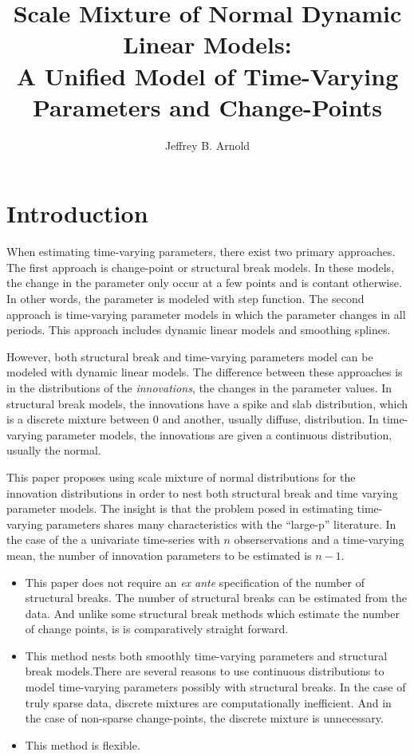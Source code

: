 \documentclass{article}
\author{Jeffrey B. Arnold}
\title{Scale Mixture of Normal Dynamic Linear Models: \\
  A Unified Model of Time-Varying Parameters and Change-Points}
\begin{document}
\maketitle{}

\section{Introduction}
\label{sec:introduction}

When estimating time-varying parameters, there exist two primary approaches.
The first approach is change-point or structural break models. 
In these models, the change in the parameter only occur at a few points and is contant otherwise.
In other words, the parameter is modeled with step function.
The second approach is time-varying parameter models in which the parameter changes in all periods.
This approach includes dynamic linear models and smoothing splines.

However, both structural break and time-varying parameters model can be modeled with dynamic linear models.
The difference between these approaches is in the distributions of the \textit{innovations}, the changes in the parameter values.
In structural break models, the innovations have a spike and slab distribution, which is a discrete mixture between 0 and another, usually diffuse, distribution.
In time-varying parameter models, the innovations are given a continuous distribution, usually the normal.

This paper proposes using scale mixture of normal distributions for the innovation distributions in order to nest both structural break and time varying parameter models.
The insight is that the problem posed in estimating time-varying parameters shares many characteristics with the ``large-p'' literature.
In the case of the a univariate time-series with $n$ obserservations and a time-varying mean, the number of innovation parameters to be estimated is $n - 1$.

\begin{itemize}
\item This paper does not require an \textit{ex ante} specification of
  the number of structural breaks. 
  The number of structural breaks can be estimated from the data.
  And unlike some structural break methods which estimate the number of change points, is is comparatively straight forward.
\item This method nests both smoothly time-varying parameters and
  structural break models.There are several reasons to use continuous
  distributions to model time-varying parameters possibly with
  structural breaks.  In the case of truly sparse data, discrete
  mixtures are computationally inefficient.  And in the case of
  non-sparse change-points, the discrete mixture is unnecessary.
\item This method is flexible.
\end{itemize}
\end{document}
